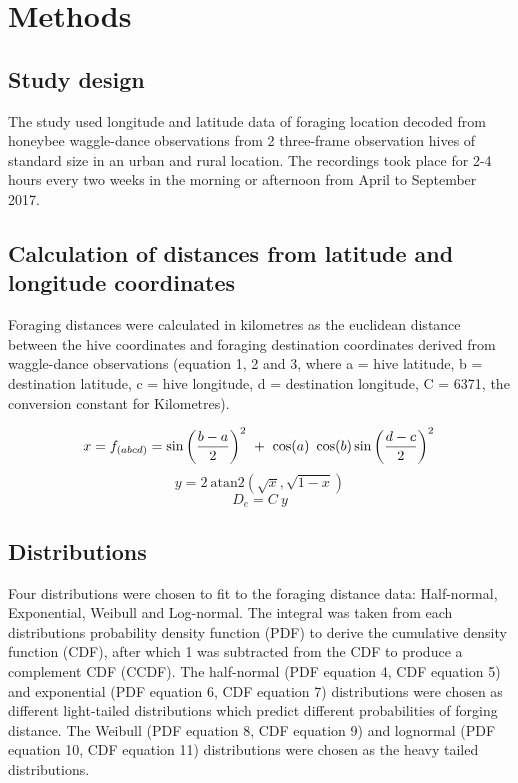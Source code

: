 \documentclass[11pt]{article}
\begin{document}
\section{Methods}
\begin{linenumbers}
\subsection{Study design}
The study used longitude and latitude data of foraging location decoded from honeybee waggle-dance observations from 2 three-frame observation hives of standard size in an urban and rural location. The recordings took place for 2-4 hours every two weeks in the morning or afternoon from April to September 2017.

\subsection{Calculation of distances from latitude and longitude coordinates}
Foraging distances were calculated in kilometres as the euclidean distance between the hive coordinates and foraging destination coordinates derived from waggle-dance observations (equation 1, 2 and 3, where a = hive latitude, b = destination latitude, c = hive longitude, d = destination longitude, C = 6371, the conversion constant for Kilometres).  

\begin{large}
	\begin{equation}
	x = f_{(abcd)} = \sin\left(\frac{b - a}{2}\right)^2\ +\ \cos(a)\ \cos(b) \sin\left(\frac{d - c}{2}\right)^2\\  
	\end{equation}
	\begin{equation}
	y = 2\ \text{atan2}(\sqrt{x}, \sqrt{1 - x})
	\end{equation}
	\begin{equation}
	 D_e = C\ y
	\end{equation}
\end{large}

\subsection{Distributions}
Four distributions were chosen to fit to the foraging distance data:  Half-normal, Exponential, Weibull and Log-normal. The integral was taken from each distributions probability density function (PDF) to derive the cumulative density function (CDF), after which 1 was subtracted from the CDF to produce a complement CDF (CCDF). The half-normal (PDF equation 4, CDF equation 5) and exponential (PDF equation 6, CDF equation 7) distributions were chosen as different light-tailed distributions which predict different probabilities of forging distance. The Weibull (PDF equation 8, CDF equation 9) and lognormal (PDF equation 10, CDF equation 11) distributions were chosen as the heavy tailed distributions.


\end{linenumbers}
\end{document}
